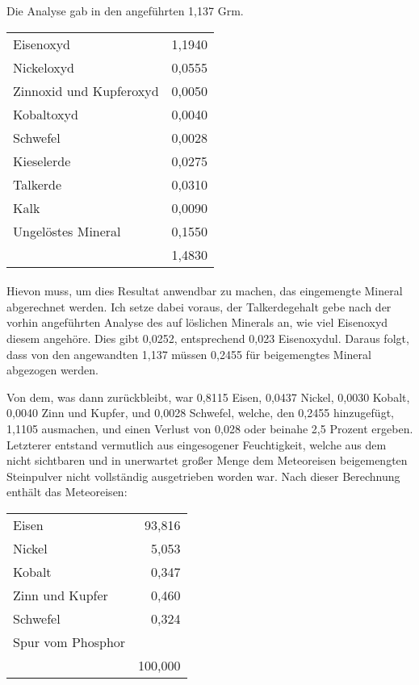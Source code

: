 \documentclass[a4paper, 11pt, oneside]{article}
\begin{document}
Die Analyse gab in den angeführten 1,137 Grm.
\begin{center}
\begin{tabular}{ l r }
    Eisenoxyd & 1,1940\\
    Nickeloxyd & 0,0555\\
    Zinnoxid und Kupferoxyd & 0,0050\\
    Kobaltoxyd & 0,0040\\
    Schwefel & 0,0028\\
    Kieselerde & 0,0275\\
    Talkerde & 0,0310\\
    Kalk & 0,0090\\
    Ungelöstes Mineral & 0,1550\\
     & 1,4830\\
\end{tabular}
\end{center}
\paragraph{}
Hievon muss, um dies Resultat anwendbar zu machen, das eingemengte Mineral abgerechnet werden. Ich setze dabei voraus, der Talkerdegehalt gebe nach der vorhin angeführten Analyse des auf löslichen Minerals an, wie viel Eisenoxyd diesem angehöre. Dies gibt 0,0252, entsprechend 0,023 Eisenoxydul. Daraus folgt, dass von den angewandten 1,137 müssen 0,2455 für beigemengtes Mineral abgezogen werden.

Von dem, was dann zurückbleibt, war 0,8115 Eisen, 0,0437 Nickel, 0,0030 Kobalt, 0,0040 Zinn und Kupfer, und 0,0028 Schwefel, welche, den 0,2455 hinzugefügt, 1,1105 ausmachen, und einen Verlust von 0,028 oder beinahe 2,5 Prozent ergeben. Letzterer entstand vermutlich aus eingesogener Feuchtigkeit, welche aus dem nicht sichtbaren und in unerwartet großer Menge dem Meteoreisen beigemengten Steinpulver nicht vollständig ausgetrieben worden war. Nach dieser Berechnung enthält das Meteoreisen:
\begin{center}
\begin{tabular}{ l r }
    Eisen & 93,816\\
    Nickel & 5,053\\
    Kobalt & 0,347\\
    Zinn und Kupfer & 0,460\\
    Schwefel & 0,324\\
    Spur vom Phosphor & \\
     & 100,000\\
\end{tabular}
\end{center}
\end{document}

